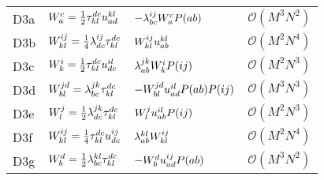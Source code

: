 \begin{center}
\begin{longtable}{@{}llll@{}}
                D3a
                & $W^{c}_{a} = \frac{1}{2} \tau^{dc}_{kl} u^{kl}_{ad}$
                & $-\lambda^{ij}_{bc} W^{c}_{a} P(ab)$
                & $\mathcal{O}(M^3 N^2)$
                \\

                D3b
                & $W^{ij}_{kl} = \frac{1}{4} \lambda^{ij}_{dc} \tau^{dc}_{kl}$
                & $W^{ij}_{kl} u^{kl}_{ab}$
                & $\mathcal{O}(M^2 N^4)$
                \\

                D3c
                & $W^{i}_{k} = \frac{1}{2}\tau^{dc}_{kl} u^{il}_{dc}$
                & $\lambda^{jk}_{ab} W^{i}_{k} P(ij)$
                & $\mathcal{O}(M^2 N^3)$
                \\

                D3d
                & $W^{jd}_{bl} = \lambda^{jk}_{bc} \tau^{dc}_{kl}$
                & $-W^{jd}_{bl} u^{il}_{ad} P(ab) P(ij)$
                & $\mathcal{O}(M^3 N^3)$
                \\

                D3e
                & $W^{j}_{l} = \frac{1}{2}\lambda^{jk}_{dc} \tau^{dc}_{kl}$
                & $W^{j}_{l} u^{il}_{ab} P(ij)$
                & $\mathcal{O}(M^2 N^3)$
                \\

                D3f
                & $W^{ij}_{kl} = \frac{1}{4}\tau^{dc}_{kl} u^{ij}_{dc}$
                & $\lambda^{kl}_{ab} W^{ij}_{kl}$
                & $\mathcal{O}(M^2 N^4)$
                \\

                D3g
                & $W^{d}_{b} = \frac{1}{2} \lambda^{kl}_{bc} \tau^{dc}_{kl}$
                & $-W^{d}_{b} u^{ij}_{ad} P(ab)$
                & $\mathcal{O}(M^3 N^2)$
                \\

            \end{longtable}
        \end{center}

